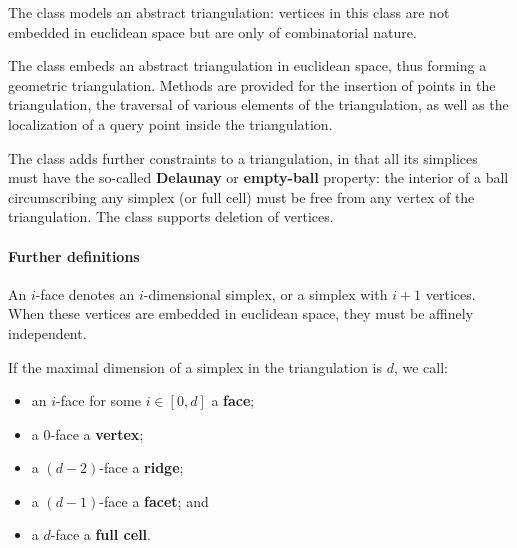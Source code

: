The class  models an abstract triangulation: vertices in this
class are not embedded in euclidean space but are only of combinatorial
nature.

The class  embeds an abstract
triangulation in euclidean space, thus forming a geometric
triangulation. Methods are
provided for the insertion %
of points in the triangulation, the
traversal of various elements of the triangulation, as well as the localization of a
query point inside the triangulation.

The class  adds further
constraints to a triangulation, in that all its simplices must have the
so-called \textbf{Delaunay} or \textbf{empty-ball} property: the interior of
a ball circumscribing any simplex (or full cell) must be free from any
vertex of the triangulation. The  class
supports deletion of vertices.




\paragraph{Further definitions}

An $i$-face denotes an $i$-dimensional simplex, or a simplex with $i+1$
vertices. When these vertices are embedded in euclidean space, they must be
affinely independent.

If the maximal dimension of a simplex in the triangulation is
$d$, we call:\begin{itemize}
\item an $i$-face for some $i\in[0,d]$ a  \textbf{face};
\item a $0$-face a \textbf{vertex};
\item a $(d-2)$-face a \textbf{ridge};
\item a $(d-1)$-face a \textbf{facet}; and
\item a $d$-face  a \textbf{full cell}.
\end{itemize}

